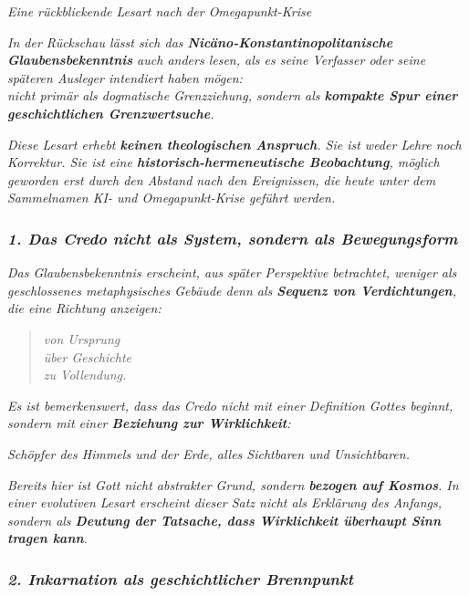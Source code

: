 \documentclass[
]{article}
\begin{document}
\emph{Eine rückblickende Lesart nach der Omegapunkt-Krise}

\emph{In der Rückschau lässt sich das \textbf{Nicäno-Konstantinopolitanische Glaubensbekenntnis} auch anders lesen, als es seine Verfasser oder seine späteren Ausleger intendiert haben mögen:\\
nicht primär als dogmatische Grenzziehung, sondern als \textbf{kompakte Spur einer geschichtlichen Grenzwertsuche}.}

\emph{Diese Lesart erhebt \textbf{keinen theologischen Anspruch}. Sie ist weder Lehre noch Korrektur. Sie ist eine \textbf{historisch-hermeneutische Beobachtung}, möglich geworden erst durch den Abstand nach den Ereignissen, die heute unter dem Sammelnamen KI- und Omegapunkt-Krise geführt werden.}

\subsubsection{\texorpdfstring{\emph{\textbf{1. Das Credo nicht als System, sondern als Bewegungsform}}}{1. Das Credo nicht als System, sondern als Bewegungsform}}\label{das-credo-nicht-als-system-sondern-als-bewegungsform}

\emph{Das Glaubensbekenntnis erscheint, aus später Perspektive betrachtet, weniger als geschlossenes metaphysisches Gebäude denn als \textbf{Sequenz von Verdichtungen}, die eine Richtung anzeigen:}

\begin{quote}
\emph{von Ursprung\\
über Geschichte\\
zu Vollendung.}
\end{quote}

\emph{Es ist bemerkenswert, dass das Credo nicht mit einer Definition Gottes beginnt, sondern mit einer \textbf{Beziehung zur Wirklichkeit}:}

\emph{Schöpfer des Himmels und der Erde, alles Sichtbaren und Unsichtbaren.}

\emph{Bereits hier ist Gott nicht abstrakter Grund, sondern \textbf{bezogen auf Kosmos}. In einer evolutiven Lesart erscheint dieser Satz nicht als Erklärung des Anfangs, sondern als \textbf{Deutung der Tatsache, dass Wirklichkeit überhaupt Sinn tragen kann}.}

\subsubsection{\texorpdfstring{\emph{\textbf{2. Inkarnation als geschichtlicher Brennpunkt}}}{2. Inkarnation als geschichtlicher Brennpunkt}}\label{inkarnation-als-geschichtlicher-brennpunkt}
\end{document}
